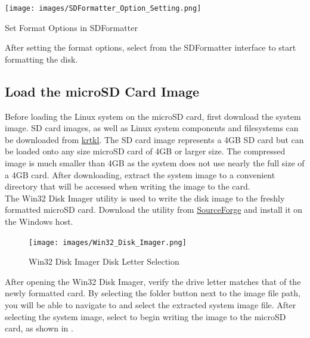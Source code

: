 \begin{marginfigure}
	\centering
	\texttt{[image: images/SDFormatter\_Option\_Setting.png]}
	\caption[Set Format Options in SDFormatter]{Set Format Options in SDFormatter}
	\label{fig:sdformatoption}
\end{marginfigure}


After setting the format options, select  from the SDFormatter interface to start formatting the disk.





\subsection{Load the microSD Card Image}

Before loading the Linux system on the microSD card, first download the system image. SD card images, as well as Linux system components and filesystems can be downloaded from \href{http://krtkl.com/downloads/}{krtkl}. The SD card image represents a 4GB SD card but can be loaded onto any size microSD card of 4GB or larger size. The compressed image is much smaller than 4GB as the system does not use nearly the full size of a 4GB card. After downloading, extract the system image to a convenient directory that will be accessed when writing the image to the card. \\

The Win32 Disk Imager utility is used to write the disk image to the freshly formatted microSD card. Download the utility from \href{http://sourceforge.net/projects/win32diskimager}{SourceForge} and install it on the Windows host. \\

\begin{figure}
	\centering
	\texttt{[image: images/Win32\_Disk\_Imager.png]}
	\caption{Win32 Disk Imager Disk Letter Selection}
\end{figure}

After opening the Win32 Disk Imager, verify the drive letter matches that of the newly formatted card. By selecting the folder button next to the image file path, you will be able to navigate to and select the extracted system image file. After selecting the system image, select  to begin writing the image to the microSD card, as shown in . \\


